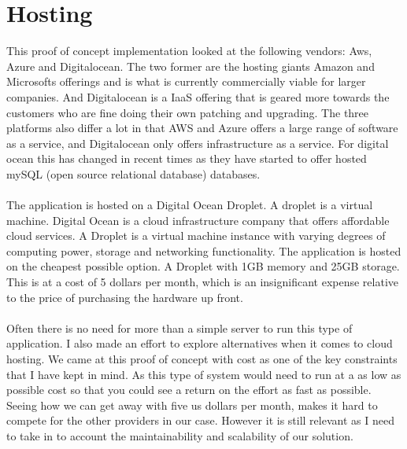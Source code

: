 \documentclass[]{uiophd}
\begin{document}
\section{Hosting}
This proof of concept implementation looked at the following vendors: Aws, Azure and Digitalocean. The two former are the hosting giants Amazon and Microsofts offerings and is what is currently commercially viable for larger companies. And Digitalocean is a IaaS offering that is geared more towards the customers who are fine doing their own patching and upgrading. The three platforms also differ a lot in that AWS and Azure offers a large range of software as a service, and Digitalocean only offers infrastructure as a service. For digital ocean this has changed in recent times as they have started to offer hosted mySQL (open source relational database) databases.
\\\\
The application is hosted on a Digital Ocean Droplet. A droplet is a virtual machine. Digital Ocean is a cloud infrastructure company that offers affordable cloud services. A Droplet is a virtual machine instance with varying degrees of computing power, storage and networking functionality. The application is hosted on the cheapest possible option. A Droplet with 1GB memory and 25GB storage. This is at a cost of 5 dollars per month, which is an insignificant expense relative to the price of purchasing the hardware up front. 
\\\\
Often there is no need for more than a simple server to run this type of application. I also made an effort to explore alternatives when it comes to cloud hosting. We came at this proof of concept with cost as one of the key constraints that I have kept in mind. As this type of system would need to run at a as low as possible cost so that you could see a return on the effort as fast as possible. Seeing how we can get away with five us dollars per month, makes it hard to compete for the other providers in our case. However it is still relevant as I need to take in to account the maintainability and scalability of our solution.
\end{document}
